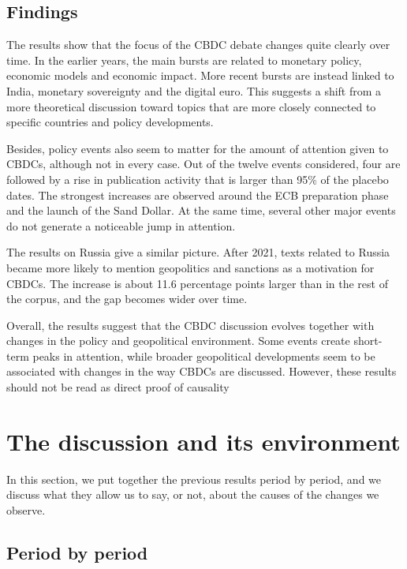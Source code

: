 \documentclass[11pt,a4paper]{article}
\begin{document}
\subsection{Findings}
The results show that the focus of the CBDC debate changes quite clearly over time. 
In the earlier years, the main bursts are related to monetary policy, economic models 
and economic impact. More recent bursts are instead linked to India, monetary sovereignty 
and the digital euro. This suggests a shift from a more theoretical discussion toward 
topics that are more closely connected to specific countries and policy developments.  

Besides, policy events also seem to matter for the amount of attention given to CBDCs, 
although not in every case. Out of the twelve events considered, four are followed 
by a rise in publication activity that is larger than 95\% of the placebo dates. 
The strongest increases are observed around the ECB preparation phase and the launch 
of the Sand Dollar. At the same time, several other major events do not generate a noticeable
 jump in attention. 

The results on Russia give a similar picture. After 2021, texts related to Russia became more likely 
to mention geopolitics and sanctions as a motivation for CBDCs. The increase is about 11.6 percentage 
points larger than in the rest of the corpus, and the gap becomes wider over time. 

Overall, the results suggest that the CBDC discussion evolves together with changes in the policy 
and geopolitical environment. Some events create short-term peaks in attention, while broader 
geopolitical developments seem to be associated with changes in the way CBDCs are discussed. 
However, these results should not be read as direct proof of causality
\section{The discussion and its environment}\label{sec:environment}

In this section, we put together the previous results period by period, and we discuss 
what they allow us to say, or not, about the causes of the changes we observe. 

\subsection{Period by period}
\end{document}
